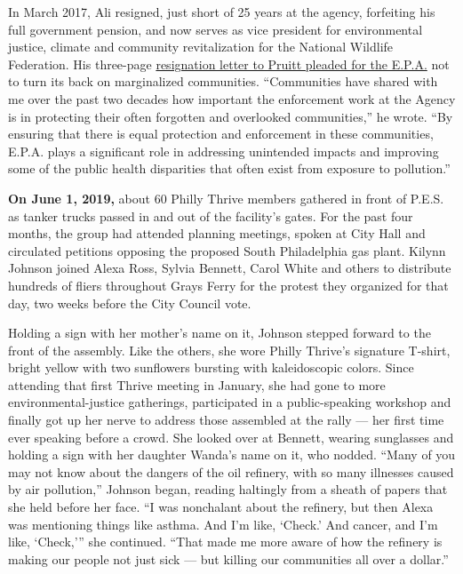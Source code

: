 In March 2017, Ali resigned, just short of 25 years at the agency,
forfeiting his full government pension, and now serves as vice president
for environmental justice, climate and community revitalization for the
National Wildlife Federation. His three-page
\href{https://www.documentcloud.org/documents/3514958-Final-Resignation-Letter-for-Administrator.html}{resignation
letter to Pruitt pleaded for the E.P.A.} not to turn its back on
marginalized communities. ``Communities have shared with me over the
past two decades how important the enforcement work at the Agency is in
protecting their often forgotten and overlooked communities,'' he wrote.
``By ensuring that there is equal protection and enforcement in these
communities, E.P.A. plays a significant role in addressing unintended
impacts and improving some of the public health disparities that often
exist from exposure to pollution.''

\textbf{On June 1, 2019,} about 60 Philly Thrive members gathered in
front of P.E.S. as tanker trucks passed in and out of the facility's
gates. For the past four months, the group had attended planning
meetings, spoken at City Hall and circulated petitions opposing the
proposed South Philadelphia gas plant. Kilynn Johnson joined Alexa Ross,
Sylvia Bennett, Carol White and others to distribute hundreds of fliers
throughout Grays Ferry for the protest they organized for that day, two
weeks before the City Council vote.

Holding a sign with her mother's name on it, Johnson stepped forward to
the front of the assembly. Like the others, she wore Philly Thrive's
signature T-shirt, bright yellow with two sunflowers bursting with
kaleidoscopic colors. Since attending that first Thrive meeting in
January, she had gone to more environmental-justice gatherings,
participated in a public-speaking workshop and finally got up her nerve
to address those assembled at the rally --- her first time ever speaking
before a crowd. She looked over at Bennett, wearing sunglasses and
holding a sign with her daughter Wanda's name on it, who nodded. ``Many
of you may not know about the dangers of the oil refinery, with so many
illnesses caused by air pollution,'' Johnson began, reading haltingly
from a sheath of papers that she held before her face. ``I was
nonchalant about the refinery, but then Alexa was mentioning things like
asthma. And I'm like, `Check.' And cancer, and I'm like, `Check,''' she
continued. ``That made me more aware of how the refinery is making our
people not just sick --- but killing our communities all over a
dollar.''

